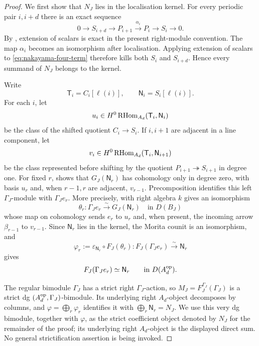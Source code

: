 \begin{proof}
We first show that \(N_J\) lies in the localisation kernel.  For every periodic pair \(i,i+d\) there is an exact sequence
\begin{equation}\label{eq:nakayama-four-term}
 0\longrightarrow S_{i+d}
 \longrightarrow P_{i+1}
 \xrightarrow{\alpha_i}P_i
 \longrightarrow S_i\longrightarrow0.
\end{equation}
By , extension of scalars is exact in the present right-module convention.  The map \(\alpha_i\) becomes an isomorphism after localisation.  Applying extension of scalars to \eqref{eq:nakayama-four-term} therefore kills both \(S_i\) and \(S_{i+d}\).  Hence every summand of \(N_J\) belongs to the kernel.

Write
\[
 \mathsf T_i=C_i[\ell(i)],
 \qquad
 \mathsf N_i=S_i[\ell(i)].
\]
For each \(i\), let
\[
 u_i\in H^0\operatorname{RHom}_{A_d}(\mathsf T_i,\mathsf N_i)
\]
be the class of the shifted quotient \(C_i\to S_i\).  If \(i,i+1\) are adjacent in a line component, let
\[
 v_i\in H^0\operatorname{RHom}_{A_d}(\mathsf T_i,\mathsf N_{i+1})
\]
be the class represented before shifting by the quotient
\(P_{i+1}\twoheadrightarrow S_{i+1}\) in degree one.  For fixed \(r\),  shows that \(G_J(\mathsf N_r)\) has cohomology only in degree zero, with basis \(u_r\) and, when \(r-1,r\) are adjacent, \(v_{r-1}\).  Precomposition identifies this left \(\Gamma_J\)-module with \(\Gamma_Je_r\).  More precisely,  with right algebra \(k\) gives an isomorphism
\[
 \theta_r:\Gamma_Je_r\xrightarrow{\sim}G_J(\mathsf N_r)
 \quad\text{in }D(B_J)
\]
whose map on cohomology sends \(e_r\) to \(u_r\) and, when present, the incoming arrow \(\beta_{r-1}\) to \(v_{r-1}\).  Since \(\mathsf N_r\) lies in the kernel, the Morita counit is an isomorphism, and
\[
 \varphi_r:=\varepsilon_{\mathsf N_r}\circ F_J(\theta_r):
 F_J(\Gamma_Je_r)\xrightarrow{\sim}\mathsf N_r
\]
gives
\begin{equation}\label{eq:nakayama-column-cancellation}
 F_J(\Gamma_Je_r)\simeq\mathsf N_r
 \qquad\text{in }D(A_d^{\mathrm{op}}).
\end{equation}

The regular bimodule \(\Gamma_J\) has a strict right \(\Gamma_J\)-action, so
\(M_J=F_J^{\Gamma_J}(\Gamma_J)\) is a strict dg
\((A_d^{\mathrm{op}},\Gamma_J)\)-bimodule.  Its underlying right \(A_d\)-object decomposes by columns, and
\(\varphi=\bigoplus_r\varphi_r\) identifies it with
\(\bigoplus_r\mathsf N_r=N_J\).  We use this very dg bimodule, together with \(\varphi\), as the strict coefficient object denoted by \(N_J\) for the remainder of the proof; its underlying right \(A_d\)-object is the displayed direct sum.  No general strictification assertion is being invoked.


\end{proof}
